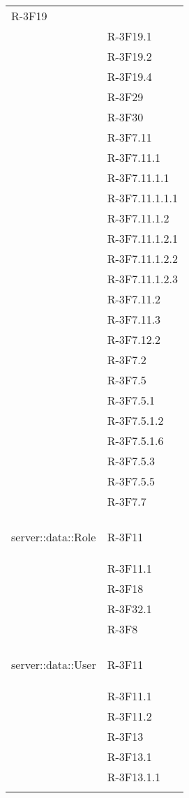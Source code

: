 \begin{longtable}{l p{3cm}}
	R-3F19 \tabularnewline &
	
	R-3F19.1 \tabularnewline &
	
	R-3F19.2 \tabularnewline &
	
	R-3F19.4 \tabularnewline &
	
	R-3F29 \tabularnewline &
	
	R-3F30 \tabularnewline &
	
	R-3F7.11 \tabularnewline &
	
	R-3F7.11.1 \tabularnewline &
	
	R-3F7.11.1.1 \tabularnewline &
	
	R-3F7.11.1.1.1 \tabularnewline &
	
	R-3F7.11.1.2 \tabularnewline &
	
	R-3F7.11.1.2.1 \tabularnewline &
	
	R-3F7.11.1.2.2 \tabularnewline &
	
	R-3F7.11.1.2.3 \tabularnewline &
	
	R-3F7.11.2 \tabularnewline &
	
	R-3F7.11.3 \tabularnewline &
	
	R-3F7.12.2 \tabularnewline &
	
	R-3F7.2 \tabularnewline &
	
	R-3F7.5 \tabularnewline &
	
	R-3F7.5.1 \tabularnewline &
	
	R-3F7.5.1.2 \tabularnewline &
	
	R-3F7.5.1.6 \tabularnewline &
	
	R-3F7.5.3 \tabularnewline &
	
	R-3F7.5.5 \tabularnewline &
	
	R-3F7.7 \tabularnewline &\tabularnewline
	\hline
	\hypertarget{server::data::Role}{server::data::Role} & R-3F11 \tabularnewline &
	
	R-3F11.1 \tabularnewline &
	
	R-3F18 \tabularnewline &
	
	R-3F32.1 \tabularnewline &
	
	R-3F8 \tabularnewline &\tabularnewline
	\hline
	\hypertarget{server::data::User}{server::data::User} & R-3F11 \tabularnewline &
	
	R-3F11.1 \tabularnewline &
	
	R-3F11.2 \tabularnewline &
	
	R-3F13 \tabularnewline &
	
	R-3F13.1 \tabularnewline &
	
	R-3F13.1.1 \tabularnewline &
	

\end{longtable}
